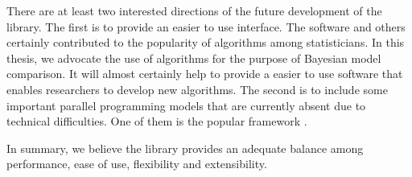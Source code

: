 There are at least two interested directions of the future development of the
library. The first is to provide an easier to use interface. The \bugs
software and others certainly contributed to the popularity of \mcmc
algorithms among statisticians. In this thesis, we advocate the use of \smc
algorithms for the purpose of Bayesian model comparison. It will almost
certainly help to provide a easier to use software that enables researchers to
develop new algorithms. The second is to include some important parallel
programming models that are currently absent due to technical difficulties.
One of them is the popular \cuda framework \cite{cuda}.

In summary, we believe the \vsmc library provides an adequate balance among
performance, ease of use, flexibility and extensibility.
